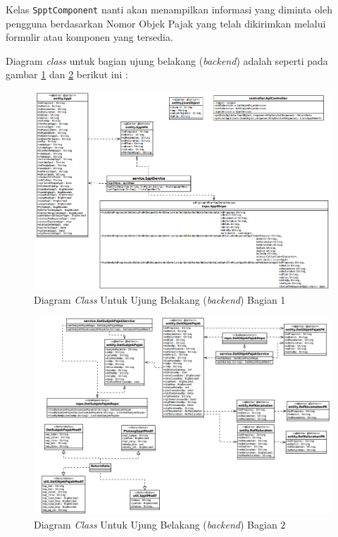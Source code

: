 \documentclass[pdftex,12pt, oneside]{article}
\begin{document}
Kelas \texttt{SpptComponent} nanti akan menampilkan informasi yang diminta oleh pengguna berdasarkan Nomor Objek Pajak yang telah dikirimkan melalui formulir atau komponen yang tersedia.

Diagram \textit{class} untuk bagian ujung belakang (\textit{backend}) adalah seperti pada gambar \ref{fig:class-dia-be-1} dan \ref{fig:class-dia-be-2} berikut ini :

\begin{figure}[H]
	\centering
	\includegraphics[width=1\textwidth]{./resources/class-dia-be1}
	\caption{Diagram \textit{Class} Untuk Ujung Belakang (\textit{backend}) Bagian 1}
	\label{fig:class-dia-be-1}
\end{figure}

\begin{figure}[H]
	\centering
	\includegraphics[width=1\textwidth]{./resources/class-dia-be2}
	\caption{Diagram \textit{Class} Untuk Ujung Belakang (\textit{backend}) Bagian 2}
	\label{fig:class-dia-be-2}
\end{figure}
\end{document}
